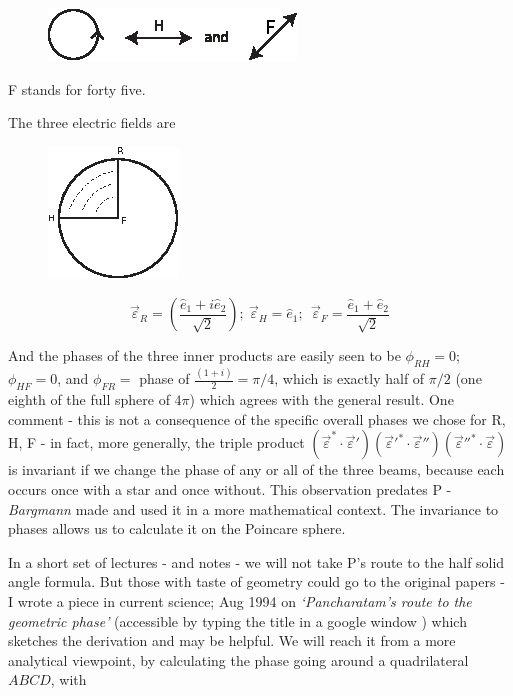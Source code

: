 \begin{figure}[H]
\centering
\includegraphics[scale=0.85]{src/images/chap26/10.jpg}
\end{figure}
F stands for forty five.

The three electric fields are
\bigskip

\begin{figure}[H]
\centering
\includegraphics[scale=1]{src/images/chap26/11.jpg}
\end{figure}
$$
\overrightarrow{\varepsilon}_R = \left(\frac{\hat{e}_1 + i \hat{e}_2}{\sqrt{2}} \right); ~ \overrightarrow{\varepsilon}_H = \hat{e}_1 ; ~~ \overrightarrow{\varepsilon}_F = \frac{\hat{e}_1  + \hat{e}_2}{\sqrt{2}}
$$

And the phases of the three inner products are easily seen to be $\phi_{RH} = 0$; $\phi_{HF} =0$, and $\phi_{FR} =$ phase of $\frac{(1+i)}{2} = \pi/4$, which is exactly half of $\pi/2$ (one eighth of the full sphere of $4\pi$) which agrees with the general result. One comment - this is not a consequence of the specific overall phases we chose for R, H, F - in fact, more generally, the triple product $(\overrightarrow{\varepsilon}^{\ast} \cdot \overrightarrow{\varepsilon}')(\overrightarrow{\varepsilon}'^{\ast} \cdot \overrightarrow{\varepsilon}'')(\overrightarrow{\varepsilon}''^{\ast} \cdot \overrightarrow{\varepsilon})$ is invariant if we change the phase of any or all of the three beams, because each occurs once with a star and once without. This observation predates P - \textit{Bargmann} made and used it in a more mathematical context. The invariance
to phases allows us to calculate it on the Poincare sphere.

In a short set of lectures - and notes - we will not take P’s route to the half
solid angle formula. But those with taste of geometry could go to the original
papers - I wrote a piece in current science; Aug 1994 on \textit{`Pancharatam's route
to the geometric phase'} (accessible by typing the title in a google window )
which sketches the derivation and may be helpful. We will reach it from a
more analytical viewpoint, by calculating the phase going around a quadrilateral
$ABCD$, with
\smallskip

